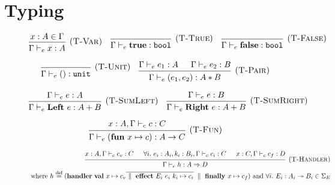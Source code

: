 \documentclass[class=article, crop=false]{standalone}
\newcommand{\dmid}{\ \parallel \ }
\newcommand{\effFalse}{\mathbf{false}}
\newcommand{\effTrue}{\mathbf{true}}
\newcommand{\effLeft}{\mathbf{Left}\ }
\newcommand{\effRight}{\mathbf{Right\ }}
\newcommand{\effFun}{\mathbf{fun}\ }
\newcommand{\effHandler}{\mathbf{handler}\ }
\newcommand{\effVal}{\mathbf{val}\ }
\newcommand{\effEffect}{\mathbf{effect}\ }
\newcommand{\effFinally}{\mathbf{finally}\ }
\newcommand{\tto}{\twoheadrightarrow}
\newcommand{\handlerType}{\Rightarrow}
\newcommand{\boolType}{\mathtt{bool}}
\newcommand{\unitType}{\mathtt{unit}}
\newcommand{\defEq}{\stackrel{\text{def}}{=}}
\begin{document}
\section{Typing}
\label{sec:full-typing}

\begin{figure}[H]
    $$
    \begin{prooftree}
      \hypo{x : A \in \Gamma}
      \infer1[(\textsc{T-Var})]{\Gamma \vdash_e x : A}
    \end{prooftree}\quad
    \begin{prooftree}
      \hypo{}
      \infer1[(\textsc{T-True})]{\Gamma \vdash_e \effTrue : \boolType}
    \end{prooftree}\quad
    \begin{prooftree}
      \hypo{}
      \infer1[(\textsc{T-False})]{\Gamma \vdash_e \effFalse : \boolType}
    \end{prooftree}
    $$
    
    $$
    \begin{prooftree}
      \hypo{}
      \infer1[(\textsc{T-Unit})]{\Gamma \vdash_e () : \unitType}
    \end{prooftree}
    \quad
    \begin{prooftree}
      \hypo{\Gamma \vdash_e e_1 : A}
      \hypo{\Gamma \vdash_e e_2 : B}
      \infer2[(\textsc{T-Pair})]{\Gamma \vdash_e (e_1, e_2) : A * B}
    \end{prooftree}
    $$
    
    $$
    \begin{prooftree}
      \hypo{\Gamma \vdash_e e : A}
      \infer1[(\textsc{T-SumLeft})]{\Gamma \vdash_e \effLeft e : A + B}
    \end{prooftree}
    \quad
    \begin{prooftree}
      \hypo{\Gamma \vdash_e e : B}
      \infer1[(\textsc{T-SumRight})]{\Gamma \vdash_e \effRight e : A + B}
    \end{prooftree}
    $$
    
    $$
    \begin{prooftree}
      \hypo{x : A, \Gamma \vdash_c c : C}
      \infer1[(\textsc{T-Fun})]{\Gamma \vdash_e (\effFun x \mapsto c) : A \to C}
    \end{prooftree}
    $$
  
    \begin{align*}
      {\begin{prooftree}
        \hypo{x : A, \Gamma \vdash_c c_v : C}
        \hypo{\forall i.\ e_i : A_i, k_i : B_i, \Gamma \vdash_c c_i : C}
        \hypo{x : C, \Gamma \vdash_c c_f : D}
        \infer3[(\textsc{T-Handler})]{\Gamma \vdash_e h : A \handlerType D}
      \end{prooftree}}\\
      \text{ where }
      h \defEq (
        \effHandler
          \effVal x \mapsto c_v
          \overline{\dmid \effEffect E_i\ e_i\ k_i \mapsto c_i} \dmid
          \effFinally x \mapsto c_f)
      \text{ and } \forall i.\ E_i : A_i \tto B_i \in \Sigma_E
    \end{align*}


\end{figure}
\end{document}
